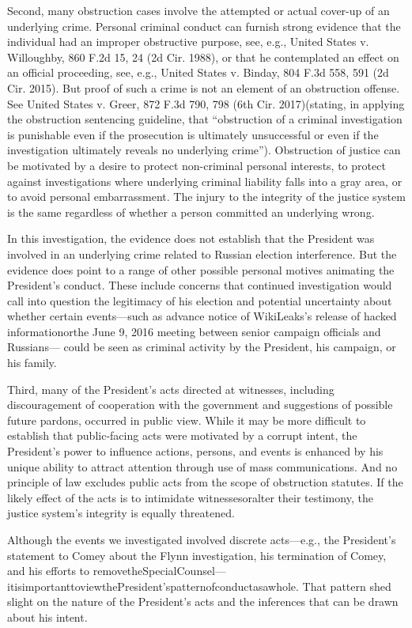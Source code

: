 {Second, many obstruction cases involve the attempted or actual cover-up of an underlying crime.
Personal criminal conduct can furnish strong evidence that the individual had an improper obstructive purpose, see, e.g., United States v. Willoughby, 860 F.2d 15, 24 (2d Cir. 1988), or that he contemplated an effect on an official proceeding, see, e.g., United States v. Binday, 804 F.3d 558, 591 (2d Cir. 2015).
But proof of such a crime is not an element of an obstruction offense.
See United States v. Greer, 872 F.3d 790, 798 (6th Cir. 2017)(stating, in applying the obstruction sentencing guideline, that “obstruction of a criminal investigation is punishable even if the prosecution is ultimately unsuccessful or even if the investigation ultimately reveals no underlying crime”).
Obstruction of justice can be motivated by a desire to protect non-criminal personal interests, to protect against investigations where underlying criminal liability falls into a gray area, or to avoid personal embarrassment.
The injury to the integrity of the justice system is the same regardless of whether a person committed an underlying wrong.

In this investigation, the evidence does not establish that the President was involved in an underlying crime related to Russian election interference.
But the evidence does point to a range of other possible personal motives animating the President's conduct.
These include concerns that continued investigation would call into question the legitimacy of his election and potential uncertainty about whether certain events—such as advance notice of WikiLeaks's release of hacked informationorthe June 9, 2016 meeting between senior campaign officials and Russians— could be seen as criminal activity by the President, his campaign, or his family.

Third, many of the President's acts directed at witnesses, including discouragement of cooperation with the government and suggestions of possible future pardons, occurred in public view.
While it may be more difficult to establish that public-facing acts were motivated by a corrupt intent, the President's power to influence actions, persons, and events is enhanced by his unique ability to attract attention through use of mass communications.
And no principle of law excludes public acts from the scope of obstruction statutes.
If the likely effect of the acts is to intimidate witnessesoralter their testimony, the justice system's integrity is equally threatened.

Although the events we investigated involved discrete acts—e.g., the President's statement to Comey about the Flynn investigation, his termination of Comey, and his efforts to removetheSpecialCounsel—itisimportanttoviewthePresident'spatternofconductasawhole.
That pattern shed slight on the nature of the President's acts and the inferences that can be drawn about his intent.

}
